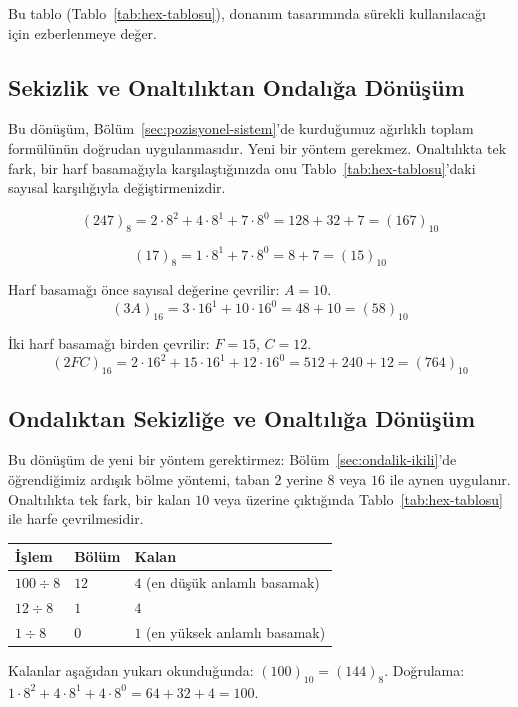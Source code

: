 Bu tablo (Tablo~\ref{tab:hex-tablosu}), donanım tasarımında sürekli kullanılacağı için
ezberlenmeye değer.

\subsection{Sekizlik ve Onaltılıktan Ondalığa Dönüşüm}
\label{sec:sekizlik-onaltilik-ondalik}

Bu dönüşüm, Bölüm~\ref{sec:pozisyonel-sistem}'de kurduğumuz ağırlıklı toplam formülünün doğrudan
uygulanmasıdır. Yeni bir yöntem gerekmez. Onaltılıkta tek fark, bir harf basamağıyla
karşılaştığınızda onu Tablo~\ref{tab:hex-tablosu}'daki sayısal karşılığıyla değiştirmenizdir.

\begin{ornek}
\[
(247)_8 = 2\cdot8^2+4\cdot8^1+7\cdot8^0 = 128+32+7 = (167)_{10}
\]
\end{ornek}

\begin{ornek}
\[
(17)_8 = 1\cdot8^1+7\cdot8^0 = 8+7 = (15)_{10}
\]
\end{ornek}

\begin{ornek}
Harf basamağı önce sayısal değerine çevrilir: $A=10$.
\[
(3A)_{16} = 3\cdot16^1+10\cdot16^0 = 48+10 = (58)_{10}
\]
\end{ornek}

\begin{ornek}
İki harf basamağı birden çevrilir: $F=15$, $C=12$.
\[
(2FC)_{16} = 2\cdot16^2+15\cdot16^1+12\cdot16^0 = 512+240+12 = (764)_{10}
\]
\end{ornek}

\subsection{Ondalıktan Sekizliğe ve Onaltılığa Dönüşüm}
\label{sec:ondalik-sekizlik-onaltilik}

Bu dönüşüm de yeni bir yöntem gerektirmez: Bölüm~\ref{sec:ondalik-ikili}'de öğrendiğimiz
ardışık bölme yöntemi, taban $2$ yerine $8$ veya $16$ ile aynen uygulanır. Onaltılıkta tek
fark, bir kalan $10$ veya üzerine çıktığında Tablo~\ref{tab:hex-tablosu} ile harfe
çevrilmesidir.

\begin{ornek}
\begin{center}
\begin{tabular}{lll}
\toprule
İşlem & Bölüm & Kalan \\
\midrule
$100 \div 8$ & $12$ & $4$ (en düşük anlamlı basamak) \\
$12 \div 8$ & $1$ & $4$ \\
$1 \div 8$ & $0$ & $1$ (en yüksek anlamlı basamak) \\
\bottomrule
\end{tabular}
\end{center}
Kalanlar aşağıdan yukarı okunduğunda: $(100)_{10}=(144)_8$. Doğrulama:
$1\cdot8^2+4\cdot8^1+4\cdot8^0=64+32+4=100$. \checkmark
\end{ornek}

